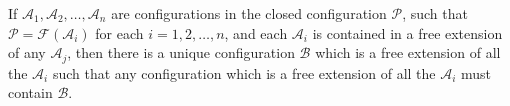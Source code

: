 If $\mathcal{A}_1, \mathcal{A}_2, \ldots, \mathcal{A}_n$ are configurations in the closed configuration $\mathcal{P}$, such that $\mathcal{P} = \mathcal{F}(\mathcal{A}_i)$ for each $i = 1, 2, \ldots, n$, and each $\mathcal{A}_i$ is contained in a free extension of any $\mathcal{A}_j$, then there is a unique configuration $\mathcal{B}$ which is a free extension of all the $\mathcal{A}_i$ such that any configuration which is a free extension of all the $\mathcal{A}_i$ must contain $\mathcal{B}$.
